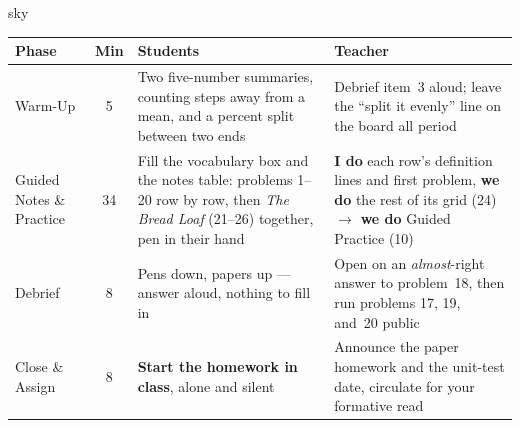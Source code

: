 \documentclass[10pt]{article}
\begin{document}
\boxguard[30]
\begin{skillbox}{sky}
\renewcommand{\arraystretch}{1.25}
\begin{tabularx}{\linewidth}{@{}l c X X@{}}
\textbf{Phase} & \textbf{Min} & \textbf{Students} & \textbf{Teacher} \\
\hline
Warm-Up & 5 & Two five-number summaries, counting steps away from a mean, and a percent split between two ends & Debrief item~3 aloud; leave the ``split it evenly'' line on the board all period \\
Guided Notes \& Practice & 34 & Fill the vocabulary box and the notes table: problems 1--20 row by row, then \emph{The Bread Loaf} (21--26) together, pen in their hand & \textbf{I do} each row's definition lines and first problem, \textbf{we do} the rest of its grid (24) $\to$ \textbf{we do} Guided Practice (10) \\
Debrief & 8 & Pens down, papers up --- answer aloud, nothing to fill in & Open on an \emph{almost}-right answer to problem~18, then run problems 17, 19, and~20 public \\
Close \& Assign & 8 & \textbf{Start the homework in class}, alone and silent & Announce the paper homework and the unit-test date, circulate for your formative read \\
\end{tabularx}
\end{skillbox}
\end{document}
